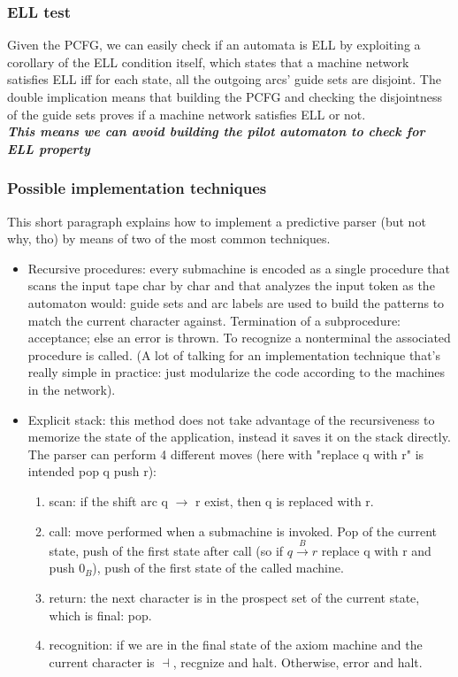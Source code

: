 \documentclass[10pt,a4paper]{article}
\begin{document}
				\subsubsection{ELL test}
					Given the PCFG, we can easily check if an automata is ELL by exploiting a corollary of the ELL condition itself, which states that a machine network satisfies ELL iff for each state, all the outgoing arcs' guide sets are disjoint. The double implication means that building the PCFG and checking the disjointness of the guide sets proves if a machine network satisfies ELL or not.\\
					\emph{\textbf{This means we can avoid building the pilot automaton to check for ELL property}}
					
				\subsubsection{Possible implementation techniques}
					This short paragraph explains how to implement a predictive parser (but not why, tho) by means of two of the most common techniques.
					\begin{itemize}
						\item Recursive procedures: every submachine is encoded as a single procedure that scans the input tape char by char and that analyzes the input token as the automaton would: guide sets and arc labels are used to build the patterns to match the current character against. Termination of a subprocedure: acceptance; else an error is thrown. To recognize a nonterminal the associated procedure is called. (A lot of talking for an implementation technique that's really simple in practice: just modularize the code according to the machines in the network).
						\item Explicit stack: this method does not take advantage of the recursiveness to memorize the state of the application, instead it saves it on the stack directly. The parser can perform 4 different moves (here with "replace q with r" is intended pop q push r):
							\begin{enumerate}
								\item scan: if the shift arc q $\rightarrow$ r exist, then q is replaced with r.
								\item call: move performed when a submachine is invoked. Pop of the current state, push of the first state after call (so if $q \xrightarrow{B} r$ replace q with r and push $0_B$), push of the first state of the called machine.
								\item return: the next character is in the prospect set of the current state, which is final: pop.
								\item recognition: if we are in the final state of the axiom machine and the current character is $\dashv$, recgnize and halt. Otherwise, error and halt.
							\end{enumerate}
					\end{itemize}
					
\end{document}

